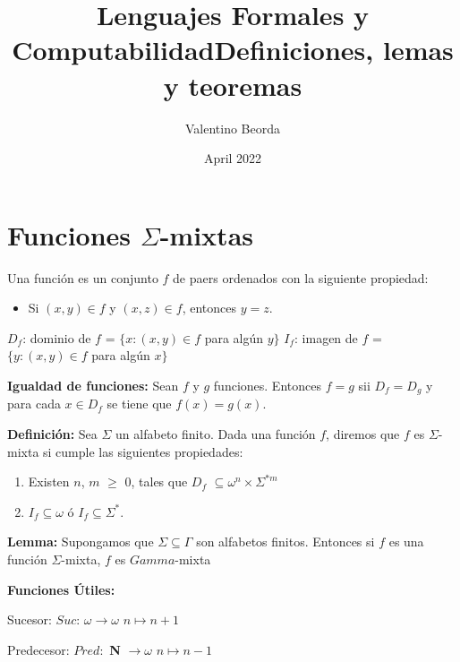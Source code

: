 \documentclass{article}
\title{Lenguajes Formales y Computabilidad\linebreak Definiciones, lemas y teoremas}
\author{Valentino Beorda}
\date{April 2022}
\begin{document}
\maketitle

\section{Funciones $\Sigma$-mixtas}

\begin{flushleft}

Una función es un conjunto $f$ de paers ordenados con la siguiente propiedad:
\begin{itemize}
\item Si $(x, y) \in f$ y $(x, z) \in f$, entonces  $y=z$.
\end{itemize}
 

$D_f$: dominio de $f$ = $\{x : (x, y) \in f$ para algún $y\}$\linebreak
$I_f$: imagen de $f$ = $\{y : (x, y) \in f$ para algún $x\}$\linebreak

\textbf{Igualdad de funciones:} Sean $f$ y $g$ funciones. Entonces $f = g$ sii $D_f = D_g$ y para cada $x \in D_f$ se tiene que $f(x) = g(x)$.\linebreak

\textbf{Definición:}
Sea $\Sigma$ un alfabeto finito. Dada una función $f$, diremos que $f$ es $\Sigma$-mixta si cumple las siguientes propiedades:
\begin{enumerate}
\item Existen $n$, $m$ $\geq$ 0, tales que $D_f$ $\subseteq \omega^n \times \Sigma^{*m}$
\item $I_f \subseteq \omega$ ó $I_f \subseteq \Sigma^*$.
\end{enumerate}


\textbf{Lemma:} Supongamos que $\Sigma \subseteq \Gamma$ son alfabetos finitos. Entonces si $f$ es una función $\Sigma$-mixta, $f$ es $Gamma$-mixta\linebreak

\textbf {Funciones Útiles:}\linebreak

Sucesor: $Suc$: $\omega \rightarrow \omega$\linebreak
\hspace*{14ex} $n \mapsto n+1$\linebreak

Predecesor: $Pred: $ \textbf{N} $\rightarrow \omega$\linebreak
\hspace*{20ex} $n \mapsto n-1$\linebreak


\end{flushleft}
\end{document}
